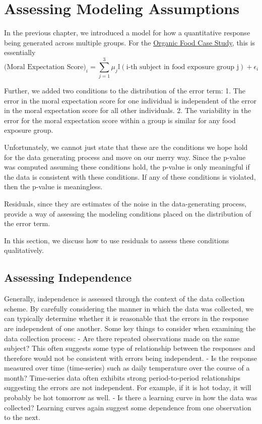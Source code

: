\documentclass[]{book}
\theoremstyle{definition}
\theoremstyle{definition}
\theoremstyle{definition}
\theoremstyle{remark}
\let\BeginKnitrBlock\begin \let\EndKnitrBlock\end
\begin{document}
\chapter{Assessing Modeling Assumptions}\label{ANOVAassessment}

In the previous chapter, we introduced a model for how a quantitative
response being generated across multiple groups. For the
\protect\hyperlink{CaseOrganic}{Organic Food Case Study}, this is
essentially \[
\text{(Moral Expectation Score)}_i = \sum_{j=1}^3 \mu_j \mathbb{I}(\text{i-th subject in food exposure group j}) + \epsilon_i
\]

Further, we added two conditions to the distribution of the error term:
1. The error in the moral expectation score for one individual is
independent of the error in the moral expectation score for all other
individuals. 2. The variability in the error for the moral expectation
score within a group is similar for any food exposure group.

Unfortunately, we cannot just state that these are the conditions we
hope hold for the data generating process and move on our merry way.
Since the p-value was computed assuming these conditions hold, the
p-value is only meaningful if the data is consistent with these
conditions. If any of these conditions is violated, then the p-value is
meaningless.

\BeginKnitrBlock{rmdkeyidea}
Residuals, since they are estimates of the noise in the data-generating
process, provide a way of assessing the modeling conditions placed on
the distribution of the error term.
\EndKnitrBlock{rmdkeyidea}

In this section, we discuss how to use residuals to assess these
conditions qualitatively.

\section{Assessing Independence}\label{assessing-independence}

Generally, independence is assessed through the context of the data
collection scheme. By carefully considering the manner in which the data
was collected, we can typically determine whether it is reasonable that
the errors in the response are independent of one another. Some key
things to consider when examining the data collection process: - Are
there repeated observations made on the same subject? This often
suggests some type of relationship between the responses and therefore
would not be consistent with errors being independent. - Is the response
measured over time (time-series) such as daily temperature over the
course of a month? Time-series data often exhibits strong
period-to-period relationships suggesting the errors are not
independent. For example, if it is hot today, it will probably be hot
tomorrow as well. - Is there a learning curve in how the data was
collected? Learning curves again suggest some dependence from one
observation to the next.
\end{document}
